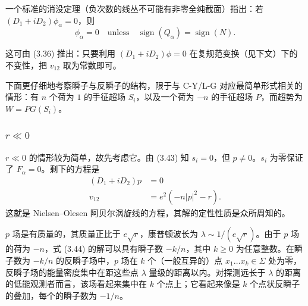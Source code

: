 一个标准的消没定理（负次数的线丛不可能有非零全纯截面）指出：若 $(D_1+iD_2)\phi_\alpha=0$，则
\begin{equation}
\phi_\alpha=0\quad\text{unless}\quad \operatorname{sign}(Q_\alpha)=\operatorname{sign}(N).
\tag{3.43}
\end{equation}

这可由 (3.36) 推出：只要利用 $(D_1+iD_2)\phi=0$ 在复规范变换（见下文）下的不变性，把 $v_{12}$ 取为常数即可。

下面更仔细地考察瞬子与反瞬子的结构，限于与 C-Y/L-G 对应最简单形式相关的情形：有 $n$ 个荷为 $1$ 的手征超场 $S_i$，以及一个荷为 $-n$ 的手征超场 $P$，而超势为 $W=PG(S_i)$。

\subsubsection*{$r\ll0$}

$r\ll0$ 的情形较为简单，故先考虑它。由 (3.43) 知 $s_i=0$，但 $p\ne0$。$s_i$ 为零保证了 $F_\alpha=0$。剩下的方程是
\begin{equation}
\begin{aligned}
(D_1+iD_2)p &= 0\\
v_{12} &= e^2(-n|p|^2-r).
\end{aligned}
\tag{3.44}
\end{equation}
这就是 Nielsen--Olesen 阿贝尔涡旋线的方程，其解的定性性质是众所周知的。

\label{op:39}
$p$ 场是有质量的，其质量正比于 $e\sqrt r$，康普顿波长为 $\lambda\sim1/(e\sqrt r)$。由于 $p$ 场的荷为 $-n$，式 (3.44) 的解可以具有瞬子数 $-k/n$，其中 $k\ge0$ 为任意整数。在瞬子数为 $-k/n$ 的反瞬子场中，$p$ 场在 $k$ 个（一般互异的）点 $x_1\ldots x_k\in\Sigma$ 处为零，反瞬子场的能量密度集中在距这些点 $\lambda$ 量级的距离以内。对探测远长于 $\lambda$ 的距离的低能观测者而言，该场看起来集中在 $k$ 个点上；它看起来像是 $k$ 个点状反瞬子的叠加，每个的瞬子数为 $-1/n$。


